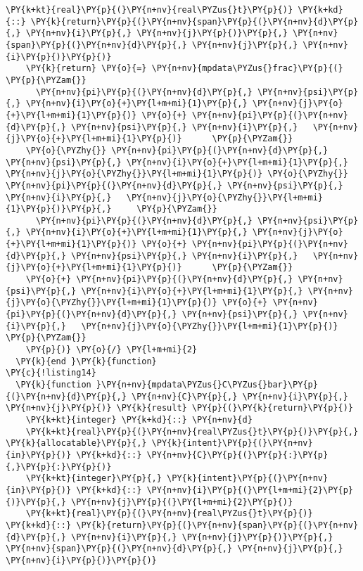\begin{Verbatim}[commandchars=\\\{\}]
    \PY{k+kt}{real}\PY{p}{(}\PY{n+nv}{real\PYZus{}t}\PY{p}{)} \PY{k+kd}{::} \PY{k}{return}\PY{p}{(}\PY{n+nv}{span}\PY{p}{(}\PY{n+nv}{d}\PY{p}{,} \PY{n+nv}{i}\PY{p}{,} \PY{n+nv}{j}\PY{p}{)}\PY{p}{,} \PY{n+nv}{span}\PY{p}{(}\PY{n+nv}{d}\PY{p}{,} \PY{n+nv}{j}\PY{p}{,} \PY{n+nv}{i}\PY{p}{)}\PY{p}{)}
    \PY{k}{return} \PY{o}{=} \PY{n+nv}{mpdata\PYZus{}frac}\PY{p}{(}                              \PY{p}{\PYZam{}}
      \PY{n+nv}{pi}\PY{p}{(}\PY{n+nv}{d}\PY{p}{,} \PY{n+nv}{psi}\PY{p}{,} \PY{n+nv}{i}\PY{o}{+}\PY{l+m+mi}{1}\PY{p}{,} \PY{n+nv}{j}\PY{o}{+}\PY{l+m+mi}{1}\PY{p}{)} \PY{o}{+} \PY{n+nv}{pi}\PY{p}{(}\PY{n+nv}{d}\PY{p}{,} \PY{n+nv}{psi}\PY{p}{,} \PY{n+nv}{i}\PY{p}{,}   \PY{n+nv}{j}\PY{o}{+}\PY{l+m+mi}{1}\PY{p}{)}      \PY{p}{\PYZam{}}
    \PY{o}{\PYZhy{}} \PY{n+nv}{pi}\PY{p}{(}\PY{n+nv}{d}\PY{p}{,} \PY{n+nv}{psi}\PY{p}{,} \PY{n+nv}{i}\PY{o}{+}\PY{l+m+mi}{1}\PY{p}{,} \PY{n+nv}{j}\PY{o}{\PYZhy{}}\PY{l+m+mi}{1}\PY{p}{)} \PY{o}{\PYZhy{}} \PY{n+nv}{pi}\PY{p}{(}\PY{n+nv}{d}\PY{p}{,} \PY{n+nv}{psi}\PY{p}{,} \PY{n+nv}{i}\PY{p}{,}   \PY{n+nv}{j}\PY{o}{\PYZhy{}}\PY{l+m+mi}{1}\PY{p}{)}\PY{p}{,}     \PY{p}{\PYZam{}}
      \PY{n+nv}{pi}\PY{p}{(}\PY{n+nv}{d}\PY{p}{,} \PY{n+nv}{psi}\PY{p}{,} \PY{n+nv}{i}\PY{o}{+}\PY{l+m+mi}{1}\PY{p}{,} \PY{n+nv}{j}\PY{o}{+}\PY{l+m+mi}{1}\PY{p}{)} \PY{o}{+} \PY{n+nv}{pi}\PY{p}{(}\PY{n+nv}{d}\PY{p}{,} \PY{n+nv}{psi}\PY{p}{,} \PY{n+nv}{i}\PY{p}{,}   \PY{n+nv}{j}\PY{o}{+}\PY{l+m+mi}{1}\PY{p}{)}      \PY{p}{\PYZam{}}
    \PY{o}{+} \PY{n+nv}{pi}\PY{p}{(}\PY{n+nv}{d}\PY{p}{,} \PY{n+nv}{psi}\PY{p}{,} \PY{n+nv}{i}\PY{o}{+}\PY{l+m+mi}{1}\PY{p}{,} \PY{n+nv}{j}\PY{o}{\PYZhy{}}\PY{l+m+mi}{1}\PY{p}{)} \PY{o}{+} \PY{n+nv}{pi}\PY{p}{(}\PY{n+nv}{d}\PY{p}{,} \PY{n+nv}{psi}\PY{p}{,} \PY{n+nv}{i}\PY{p}{,}   \PY{n+nv}{j}\PY{o}{\PYZhy{}}\PY{l+m+mi}{1}\PY{p}{)}      \PY{p}{\PYZam{}}
    \PY{p}{)} \PY{o}{/} \PY{l+m+mi}{2}
  \PY{k}{end }\PY{k}{function}
\PY{c}{!listing14}
  \PY{k}{function }\PY{n+nv}{mpdata\PYZus{}C\PYZus{}bar}\PY{p}{(}\PY{n+nv}{d}\PY{p}{,} \PY{n+nv}{C}\PY{p}{,} \PY{n+nv}{i}\PY{p}{,} \PY{n+nv}{j}\PY{p}{)} \PY{k}{result} \PY{p}{(}\PY{k}{return}\PY{p}{)}
    \PY{k+kt}{integer} \PY{k+kd}{::} \PY{n+nv}{d}
    \PY{k+kt}{real}\PY{p}{(}\PY{n+nv}{real\PYZus{}t}\PY{p}{)}\PY{p}{,} \PY{k}{allocatable}\PY{p}{,} \PY{k}{intent}\PY{p}{(}\PY{n+nv}{in}\PY{p}{)} \PY{k+kd}{::} \PY{n+nv}{C}\PY{p}{(}\PY{p}{:}\PY{p}{,}\PY{p}{:}\PY{p}{)} 
    \PY{k+kt}{integer}\PY{p}{,} \PY{k}{intent}\PY{p}{(}\PY{n+nv}{in}\PY{p}{)} \PY{k+kd}{::} \PY{n+nv}{i}\PY{p}{(}\PY{l+m+mi}{2}\PY{p}{)}\PY{p}{,} \PY{n+nv}{j}\PY{p}{(}\PY{l+m+mi}{2}\PY{p}{)}
    \PY{k+kt}{real}\PY{p}{(}\PY{n+nv}{real\PYZus{}t}\PY{p}{)} \PY{k+kd}{::} \PY{k}{return}\PY{p}{(}\PY{n+nv}{span}\PY{p}{(}\PY{n+nv}{d}\PY{p}{,} \PY{n+nv}{i}\PY{p}{,} \PY{n+nv}{j}\PY{p}{)}\PY{p}{,} \PY{n+nv}{span}\PY{p}{(}\PY{n+nv}{d}\PY{p}{,} \PY{n+nv}{j}\PY{p}{,} \PY{n+nv}{i}\PY{p}{)}\PY{p}{)}


\end{Verbatim}
